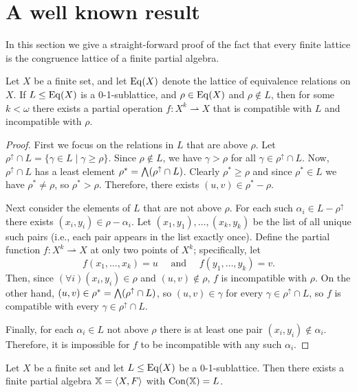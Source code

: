 \section{A well known result}
\label{sec:simple-proof-well}
In this section we give a straight-forward proof of the fact that every finite
lattice is the congruence lattice of a finite partial algebra.


\begin{lemma}
Let $X$ be a finite set, and let $\operatorname{Eq}(X)$ denote the lattice of equivalence
relations on $X$. If $L\leq \operatorname{Eq}(X)$ is a 0-1-sublattice,
and $\rho \in \operatorname{Eq}(X)$ and $\rho \notin L$, then for some $k < \omega$ there exists a partial
operation $f\colon X^k \rightharpoonup X$ that is compatible with $L$ and
incompatible with $\rho$.
\end{lemma}
\begin{proof}
  First we focus on the relations in $L$ that are above $\rho$.
  Let $\rho^\uparrow \cap L = \{\gamma \in L \mid \gamma \geq \rho\}$.
  Since $\rho\notin L$, we have $\gamma > \rho$ for all $\gamma \in \rho^\uparrow \cap L$.
  Now, $\rho^\uparrow \cap L$ has a least element
  $\rho^* = \bigwedge (\rho^\uparrow \cap L)$.  Clearly
  $\rho^*\geq \rho$ and since $\rho^* \in L$ we have
  $\rho^*\neq \rho$, so
  $\rho^* > \rho$.  Therefore, there exists $(u,v) \in \rho^* - \rho$.

  Next consider the elements of $L$ that are not above $\rho$. For each such
  $\alpha_i \in L - \rho^\uparrow$ there exists $(x_i, y_i) \in \rho -\alpha_i$.
  Let $(x_1, y_1), \dots, (x_k, y_k)$ be the list of all unique such pairs
  (i.e., each pair appears in the list exactly once).
  Define the partial function $f\colon X^k \rightharpoonup X$ at only two points of $X^k$; specifically, let
  \[ f(x_1, \dots, x_k) = u \quad \text{ and } \quad f(y_1, \dots, y_k) = v. \]
  Then, since $(\forall i)(x_i, y_i) \in \rho$ and $(u,v) \notin \rho$, 
  $f$ is incompatible with $\rho$.  On the other hand,
  $(u,v) \in  \rho^* = \bigwedge (\rho^\uparrow \cap L)$, so
  $(u,v) \in \gamma$  for every $\gamma \in \rho^\uparrow \cap L$, so
  $f$ is compatible with every $\gamma \in \rho^\uparrow \cap L$.
  
  
  Finally, for each $\alpha_i\in L$ not above $\rho$ there is at least one pair
  $(x_i, y_i)\notin \alpha_i$.  Therefore, it is impossible for $f$ to be
  incompatible with any such $\alpha_i$. 
\end{proof}

\begin{theorem}
Let $X$ be a finite set and let $L\leq \operatorname{Eq}(X)$ be a 0-1-sublattice.
Then there exists a finite partial algebra
$\mathbb X = \langle X, F\rangle$ with $\operatorname{Con}(\mathbb X) =  L$.
\end{theorem}

